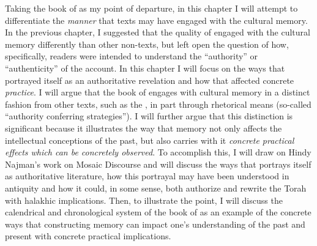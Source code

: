 Taking the book of \jub as my point of departure, in this chapter I will attempt to differentiate the \emph{manner} that \rwb texts may have engaged with the cultural memory. In the previous chapter, I suggested that the \psgraphical quality of \ga engaged with the cultural memory differently than other non-\psgraphical texts, but left open the question of how, specifically, readers were intended to understand the ``authority'' or ``authenticity'' of the account. In this chapter I will focus on the ways that \jub portrayed itself as an authoritative revelation and how that affected concrete \emph{practice}. I will argue that the book of \jub engages with cultural memory in a distinct fashion from other texts, such as the \ga, in part through rhetorical means (so-called ``authority conferring strategies''). I will further argue that this distinction is significant because it illustrates the way that memory not only affects the intellectual conceptions of the past, but also carries with it \emph{concrete practical effects which can be concretely observed}. To accomplish this, I will draw on Hindy Najman's work on Mosaic Discourse and will discuss the ways that \jub portrays itself as authoritative literature, how this portrayal may have been understood in antiquity and how it could, in some sense, both authorize and rewrite the Torah with halakhic implications. Then, to illustrate the point, I will discuss the calendrical and chronological system of the book of \jub as an example of the concrete ways that constructing memory can impact one's understanding of the past and present with concrete practical implications.
